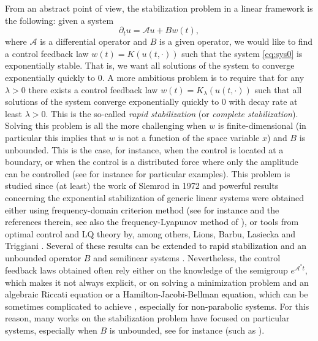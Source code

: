 \documentclass[11pt, dvipsnames]{amsart}
\begin{document}
From an abstract point of view, the stabilization problem in a linear framework is the following: given a system
\begin{equation}
\label{eq:sys0}
    \partial_{t}u = \mathcal{A}u + Bw(t),
\end{equation}
where $\mathcal{A}$ is a differential operator and $B$ is a given operator, we would like to find a control feedback law $w(t)=K(u(t,\cdot))$ such that the system \eqref{eq:sys0} is exponentially stable. That is, we want all solutions of the system to converge exponentially quickly to 0. 
A more ambitious problem is to require that for any $\lambda>0$ there exists a control feedback law $w(t)=K_{\lambda}(u(t,\cdot))$ such that all solutions of the system converge exponentially quickly to 0 with decay rate at least $\lambda>0$. This is the so-called \emph{rapid stabilization} (or \emph{complete stabilization}). Solving this problem is all the more challenging when $w$ is finite-dimensional (in particular this implies that $w$ is not a function of the space variable $x$) and $B$ is unbounded. This is the case, for instance, when the control is located at a boundary, or when the control is a distributed force where only the amplitude can be controlled (see for instance \cite{beauchard2010local,Coron2014-local,alabau2021superexponential,Coron2022-stabilization}
for particular examples). This problem is studied since (at least) the work of Slemrod in 1972 \cite{slemrod1972linear} and powerful results concerning the exponential stabilization of generic linear systems were obtained \textcolor{black}{either using frequency-domain criterion method (see for instance \cite{Rebarber2007frequency,Pruss1984spectrum, Huang1985characteristic} and the references therein, see also the frequency-Lyapunov method of \cite{xiang2024quantitative}), or} tools from optimal control and LQ theory by, among others, Lions, Barbu, Lasiecka and Triggiani \cite{lions1971optimal,barbu2018controllability,LT1,LT2}\textcolor{black}{. Several of these results can be extended to rapid stabilization and an unbounded operator $B$ \cite{urquiza2005rapid,vest2013rapid,badra2014fattorini,trelat2019characterization,liu2022characterizations,ma2023feedback,kunisch2025frequency}} and semilinear systems \cite{badra2011stabilization,breiten2014riccati,barbu2018controllability,nguyen2024stabilization,badra2020local}. Nevertheless, the control feedback laws obtained often rely either on the knowledge of the semigroup $e^{\mathcal{A}^{*}t}$, which makes it not always explicit, or on solving a minimization problem and an algebraic Riccati equation \textcolor{black}{or a Hamilton-Jacobi-Bellman equation}, 
which can be sometimes complicated to achieve \cite{komornik1997rapid}, \textcolor{black}{especially for non-parabolic systems}.
For this reason, many works on the stabilization problem have focused on particular systems, especially when $B$ is unbounded, see for instance (such as \cite{BastinCoronBook,komornik1997rapid,zuazua1990uniform,raymond2007feedback}).\\
\end{document}
